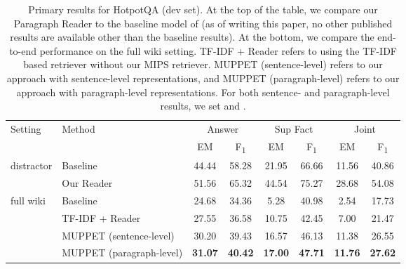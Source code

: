 \documentclass[11pt,a4paper,dvipsnames]{article}
\newcommand\fone{F\textsubscript{1} }
\begin{document}
\begin{table*}[!ht]
    \small
    \centering
    \begin{tabular}{llcccccc}
        \toprule
        \multirow{2}{*}{Setting} & \multirow{2}{*}{Method} & \multicolumn{2}{c}{Answer} & \multicolumn{2}{c}{Sup Fact} & \multicolumn{2}{c}{Joint} \\
        \cmidrule{3-8}
        & & EM & \fone & EM & \fone & EM & \fone \\
        \midrule
        \multirow{2}{*}{distractor} 
        & Baseline \citep{Yang0ZBCSM18hotpot} & 44.44 & 58.28 & 21.95 & 66.66 & 11.56 & 40.86 \\
        \cmidrule{2-8}
        & Our Reader & 51.56 & 65.32 & 44.54 & 75.27 & 28.68 & 54.08 \\
        \midrule
        \multirow{4}{*}{full wiki} 
        & Baseline \citep{Yang0ZBCSM18hotpot} & 24.68 & 34.36 & \phantom{0}5.28 & 40.98 & \phantom{0}2.54 & 17.73 \\
        \cmidrule{2-8}
        & TF-IDF + Reader & 27.55 & 36.58 & 10.75 & 42.45 & \phantom{0}7.00 & 21.47 \\
        & MUPPET (sentence-level) & 30.20 & 39.43 & 16.57 & 46.13 & 11.38 & 26.55 \\
        & MUPPET (paragraph-level) & \textbf{31.07} & \textbf{40.42} & \textbf{17.00} & \textbf{47.71} & \textbf{11.76} & \textbf{27.62} \\
        \bottomrule
    \end{tabular}
    \caption{Primary results for HotpotQA (dev set). At the top of the table, we compare our Paragraph Reader to the baseline model of \citet{Yang0ZBCSM18hotpot} (as of writing this paper, no other published results are available other than the baseline results). At the bottom, we compare the end-to-end performance on the full wiki setting. TF-IDF + Reader refers to using the TF-IDF based retriever without our MIPS retriever. MUPPET (sentence-level) refers to our approach with sentence-level representations, and MUPPET (paragraph-level) refers to our approach with paragraph-level representations. For both sentence- and paragraph-level results, we set  and . } 
    \label{tab:primary_hotpot}
\end{table*}
\end{document}
